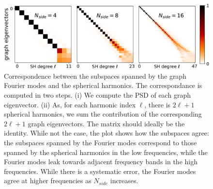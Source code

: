 \documentclass{article} %
\newcommand{\figref}[1]{Figure~\ref{fig:#1}}
\renewcommand{\b}[1]{{\bm{#1}}}   %
\newcommand{\1}{\b{1}}              %
\newcommand{\0}{\b{0}}              %
\begin{document}
\begin{figure}[t!]
	\centering
	\includegraphics[width=\linewidth]{subspace_harmonics_eigenvectors_v2}
	\caption{Correspondence between the subspaces spanned by the graph Fourier modes and the spherical harmonics.
		The correspondance is computed in two steps. (i) We compute the PSD of each graph eigenvector.
		(ii) As, for each harmonic index $\ell$, there is $2\ell+1$ spherical harmonics, we sum the contribution of the corresponding $2\ell+1$ graph eigenvectors.
		The matrix should ideally be the identity.
		While not the case, the plot shows how the subspaces agree: the subspaces spanned by the Fourier modes correspond to those spanned by the spherical harmonics in the low frequencies, while the Fourier modes leak towards adjacent frequency bands in the high frequencies.
		While there is a systematic error, the Fourier modes agree at higher frequencies as $N_{side}$ increases.}
		\label{fig:subspace_harmonics_eigenvectors}
\end{figure}
\end{document}
